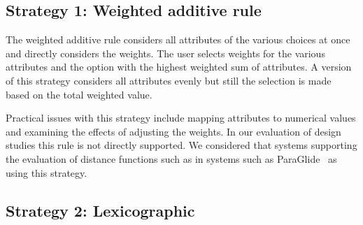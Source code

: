 
\subsection{Strategy 1: Weighted additive rule}\label{weighted-additive-rule}

The weighted additive rule considers all
attributes of the various choices at once and directly considers 
the weights. The user selects weights for the various attributes and 
the option with the highest weighted sum of attributes.
A version of this strategy considers all attributes evenly but still
the selection is made based on the total weighted value.

Practical issues with this strategy include mapping attributes to numerical values
and examining the effects of adjusting the weights. In our evaluation of
design studies this rule is not directly supported. We considered that
systems supporting the evaluation of distance functions such as 
in systems such as ParaGlide~\citep{Bergner:2013} as using this strategy.

\begin{table}[tb]
  \begin{center}
    \caption{Classification of the 21 papers listed in 
             Sedlmair et al.~\citep{Sedlmair:2014} according to which decision making
             strategies.  %
    }
    \label{tbl:decision-types}
  \end{center}
\end{table}

\subsection{Strategy 2: Lexicographic}\label{lexicographic}

